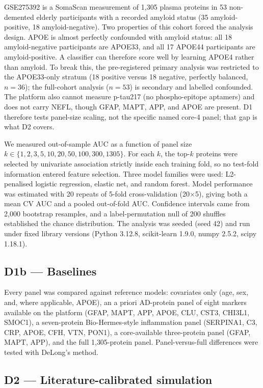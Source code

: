 \documentclass{article}
\begin{document}
GSE275392 is a SomaScan measurement of 1{,}305 plasma proteins in 53
non-demented elderly participants with a recorded amyloid status (35
amyloid-positive, 18 amyloid-negative). Two properties of this cohort forced
the analysis design. APOE is almost perfectly confounded with amyloid status:
all 18 amyloid-negative participants are APOE33, and all 17 APOE44 participants
are amyloid-positive. A classifier can therefore score well by learning APOE4
rather than amyloid. To break this, the pre-registered primary analysis was
restricted to the APOE33-only stratum (18 positive versus 18 negative,
perfectly balanced, $n=36$); the full-cohort analysis ($n=53$) is secondary
and labelled confounded. The platform also cannot measure p-tau217 (no
phospho-epitope aptamers) and does not carry NEFL, though GFAP, MAPT, APP, and
APOE are present. D1 therefore tests panel-size scaling, not the specific named
core-4 panel; that gap is what D2 covers.

We measured out-of-sample AUC as a function of panel size
$k \in \{1, 2, 3, 5, 10, 20, 50, 100, 300, 1305\}$. For each $k$, the top-$k$
proteins were selected by univariate association strictly inside each training
fold, so no test-fold information entered feature selection. Three model
families were used: L2-penalised logistic regression, elastic net, and random
forest. Model performance was estimated with 20 repeats of 5-fold
cross-validation (20$\times$5), giving both a mean CV AUC and a pooled
out-of-fold AUC. Confidence intervals came from 2{,}000 bootstrap resamples,
and a label-permutation null of 200 shuffles established the chance
distribution. The analysis was seeded (seed 42) and run under fixed library
versions (Python 3.12.8, scikit-learn 1.9.0, numpy 2.5.2, scipy 1.18.1).

\subsection{D1b --- Baselines}

Every panel was compared against reference models: covariates only (age, sex,
and, where applicable, APOE), an a priori AD-protein panel of eight markers
available on the platform (GFAP, MAPT, APP, APOE, CLU, CST3, CHI3L1, SMOC1), a
seven-protein Bio-Hermes-style inflammation panel (SERPINA1, C3, CRP, APOE,
CFH, VTN, PON1), a core-available three-protein panel (GFAP, MAPT, APP), and
the full 1{,}305-protein panel. Panel-versus-full differences were tested with
DeLong's method.

\subsection{D2 --- Literature-calibrated simulation}
\end{document}
